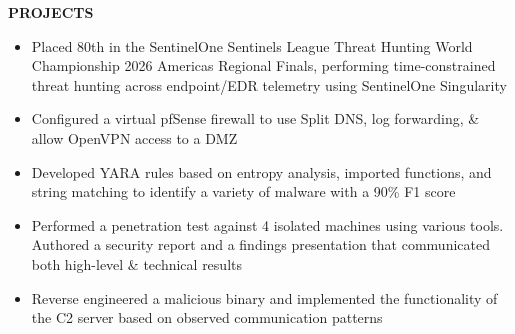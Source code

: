 \textbf{PROJECTS}

\begin{itemize}
	\item{Placed 80th in the SentinelOne Sentinels League Threat Hunting World Championship 2026 Americas Regional Finals, performing time-constrained threat hunting across endpoint/EDR telemetry using SentinelOne Singularity}
	\item{Configured a virtual pfSense firewall to use Split DNS, log forwarding, \& allow OpenVPN access to a DMZ}
	\item{Developed YARA rules based on entropy analysis, imported functions, and string matching to identify a variety of malware with a 90\% F1 score}
	\item{Performed a penetration test against 4 isolated machines using various tools. Authored a security report and a findings presentation that communicated both high-level \& technical results}
	\item{Reverse engineered a malicious binary and implemented the functionality of the C2 server based on observed communication patterns}
\end{itemize}